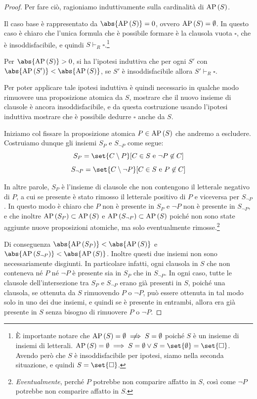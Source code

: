 \begin{proof}
  Per fare ciò, ragioniamo induttivamente sulla cardinalità di \(\AP[S]\).

  Il caso base è rappresentato da \(\abs{\AP[S]} = 0\), ovvero \(\AP[S] = \emptyset\). In questo caso è chiaro che l'unica formula che è possibile formare è la clausola vuota \(\square\), che è insoddisfacibile, e quindi \(S\vdash_R \square\).\footnote{È importante notare che \(\AP[S]=\emptyset\centernot\implies S = \emptyset\) poiché \(S\) è un insieme di insiemi di letterali. \(\AP[S]=\emptyset \implies  S = \emptyset \lor S = \set{\emptyset} = \set{\square}\). Avendo però che \(S\) è insoddisfacibile per ipotesi, siamo nella seconda situazione, e quindi \(S = \set{\square}\).}

  Per \(\abs{\AP[S]}>0\), si ha l'ipotesi induttiva che per ogni \(S'\) con \(\abs{\AP[S']} < \abs{\AP[S]}\), se \(S'\) è insoddisfacibile allora \(S'\vdash_R \square\).

  Per poter applicare tale ipotesi induttiva è quindi necessario in qualche modo rimuovere una proposizione atomica da \(S\), mostrare che il nuovo insieme di clausole è ancora insoddisfacibile, e da questa costruzione usando l'ipotesi induttiva mostrare che è possibile dedurre \(\square\) anche da \(S\).

  Iniziamo col fissare la proposizione atomica \(P\in\AP[S]\) che andremo a escludere. Costruiamo dunque gli insiemi \(S_P\) e \(S_{\neg P}\) come segue:
  \[S_P = \set{C\setminus P}[C\in S \text{ e } \neg P \not\in C]\]
  \[S_{\neg P} =  \set{C\setminus \neg P}[C\in S \text{ e }  P \not\in C]\]

  In altre parole, \(S_P\) è l'insieme di clausole che non contengono il letterale negativo di \(P\), a cui se presente è stato rimosso il letterale positivo di \(P\) e viceversa per \(S_{\neg P}\). In questo modo è chiaro che \(P\) non è presente in \(S_P\) e \(\neg P\) non è presente in \(S_{\neg P}\), e che inoltre \(\AP[S_P] \subset \AP[S]\) e \(\AP[S_{\neg P}]\subset \AP[S]\) poiché non sono state aggiunte nuove proposizioni atomiche, ma solo eventualmente rimosse.\footnote{\emph{Eventualmente}, perché \(P\) potrebbe non comparire affatto in \(S\), così come \(\neg P\) potrebbe non comparire affatto in \(S\).}

  Di conseguenza \(\abs{\AP[S_P]}<\abs{\AP[S]}\) e \(\abs{\AP[S_{\neg P}]}<\abs{\AP[S]}\).
  Inoltre questi due insiemi non sono necessariamente disgiunti. In particolare infatti, ogni clausola in \(S\) che non conteneva né \(P\) né \(\neg P\) è presente sia in \(S_P\) che in \(S_{\neg P}\). In ogni caso, tutte le clausole dell'intersezione tra \(S_P\) e \(S_{\neg P}\) erano già presenti in \(S\), poiché una clausola, se ottenuta da \(S\) rimuovendo \(P\) o \(\neg P\), può essere ottenuta in tal modo solo in uno dei due insiemi, e quindi se è presente in entrambi, allora era già presente in \(S\) senza bisogno di rimuovere \(P\) o \(\neg P\).


\end{proof}
